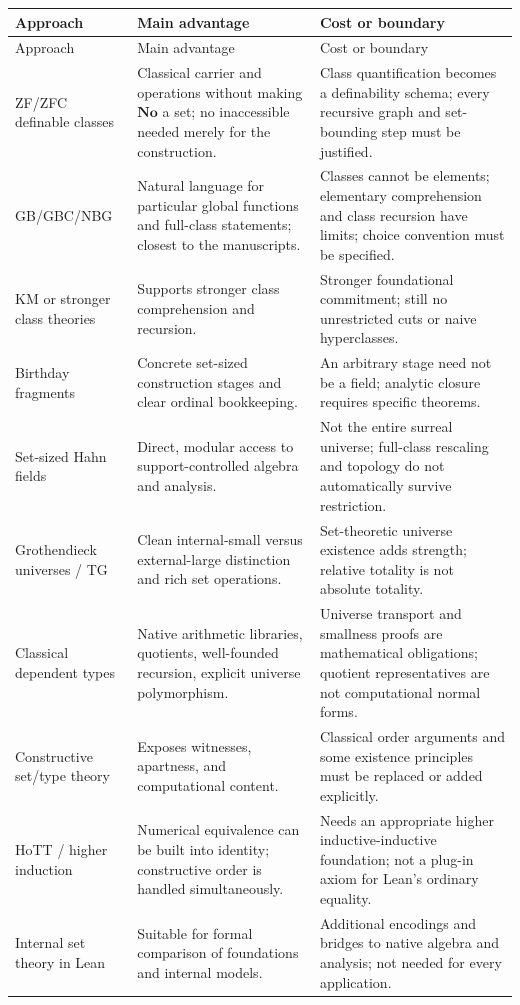 \documentclass[11pt,letterpaper]{article}
\numberwithin{equation}{section}
\theoremstyle{definition}
\theoremstyle{remark}
\newcommand{\No}{\mathbf{No}}
\begin{document}
\begin{longtable}{@{}L{0.20\textwidth}L{0.34\textwidth}L{0.37\textwidth}@{}}
\toprule
Approach & Main advantage & Cost or boundary\\\midrule
\endfirsthead
\toprule
Approach & Main advantage & Cost or boundary\\\midrule
\endhead
\bottomrule\endfoot
ZF/ZFC definable classes & Classical carrier and operations without making $\No$ a set; no inaccessible needed merely for the construction. & Class quantification becomes a definability schema; every recursive graph and set-bounding step must be justified.\\[0.4em]
GB/GBC/NBG & Natural language for particular global functions and full-class statements; closest to the manuscripts. & Classes cannot be elements; elementary comprehension and class recursion have limits; choice convention must be specified.\\[0.4em]
KM or stronger class theories & Supports stronger class comprehension and recursion. & Stronger foundational commitment; still no unrestricted cuts or naive hyperclasses.\\[0.4em]
Birthday fragments & Concrete set-sized construction stages and clear ordinal bookkeeping. & An arbitrary stage need not be a field; analytic closure requires specific theorems.\\[0.4em]
Set-sized Hahn fields & Direct, modular access to support-controlled algebra and analysis. & Not the entire surreal universe; full-class rescaling and topology do not automatically survive restriction.\\[0.4em]
Grothendieck universes / TG & Clean internal-small versus external-large distinction and rich set operations. & Set-theoretic universe existence adds strength; relative totality is not absolute totality.\\[0.4em]
Classical dependent types & Native arithmetic libraries, quotients, well-founded recursion, explicit universe polymorphism. & Universe transport and smallness proofs are mathematical obligations; quotient representatives are not computational normal forms.\\[0.4em]
Constructive set/type theory & Exposes witnesses, apartness, and computational content. & Classical order arguments and some existence principles must be replaced or added explicitly.\\[0.4em]
HoTT / higher induction & Numerical equivalence can be built into identity; constructive order is handled simultaneously. & Needs an appropriate higher inductive-inductive foundation; not a plug-in axiom for Lean's ordinary equality.\\[0.4em]
Internal set theory in Lean & Suitable for formal comparison of foundations and internal models. & Additional encodings and bridges to native algebra and analysis; not needed for every application.\\[0.4em]
\end{longtable}
\end{document}

